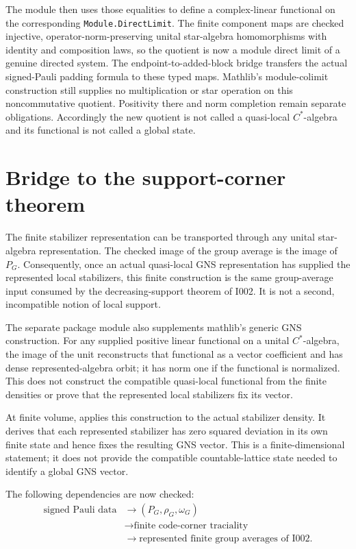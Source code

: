 \documentclass[11pt,reqno]{amsart}
\numberwithin{equation}{section}
\theoremstyle{definition}
\theoremstyle{remark}
\begin{document}
The module  then uses those equalities to
define a complex-linear functional on the corresponding
\texttt{Module.DirectLimit}.  The finite component maps are checked injective,
operator-norm-preserving unital star-algebra homomorphisms with identity and
composition laws, so the quotient is now a module direct limit of a genuine
directed system.  The
endpoint-to-added-block bridge transfers the actual signed-Pauli padding
formula to these typed maps.  Mathlib's module-colimit construction still
supplies no multiplication or star operation on this noncommutative quotient.
Positivity there and norm completion remain separate obligations.  Accordingly
the new quotient is not called a quasi-local $C^*$-algebra and its functional
is not called a global state.

\section{Bridge to the support-corner theorem}
\label{sec:bridge}

The finite stabilizer representation can be transported through any unital
star-algebra representation.  The checked image of the group average is the
image of $P_G$.  Consequently, once an actual quasi-local GNS representation
has supplied the represented local stabilizers, this finite construction is
the same group-average input consumed by the decreasing-support theorem of
I002.  It is not a second, incompatible notion of local support.

The separate package module  also supplements
mathlib's generic GNS construction.  For any supplied positive linear
functional on a unital $C^*$-algebra, the image of the unit reconstructs that
functional as a vector coefficient and has dense represented-algebra orbit;
it has norm one if the functional is normalized.  This does not construct the
compatible quasi-local functional from the finite densities or prove that the
represented local stabilizers fix its vector.

At finite volume,  applies this construction to the
actual stabilizer density.  It derives that each represented stabilizer has
zero squared deviation in its own finite state and hence fixes the resulting
GNS vector.  This is a finite-dimensional statement; it does not provide the
compatible countable-lattice state needed to identify a global GNS vector.

The following dependencies are now checked:
\begin{equation}
  \begin{aligned}
    \text{signed Pauli data}
    &\longrightarrow (P_G,\rho_G,\omega_G) \\
    &\longrightarrow \text{finite code-corner traciality} \\
    &\longrightarrow \text{represented finite group averages of I002}.
  \end{aligned}
  \label{eq:checked_dependency_chain}
\end{equation}
\end{document}
